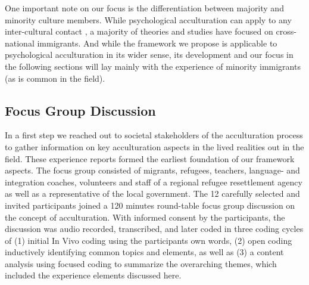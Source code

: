 \documentclass[man, 12pt, a4paper]{apa7}
\begin{document}
One important note on our focus is the differentiation between majority and minority culture members. While psychological acculturation can apply to any inter-cultural contact \citep[including, for example, the contact between indigenous people and colonial settlers, e.g.,][]{Berry1974}, a majority of theories and studies have focused on cross-national immigrants. And while the framework we propose is applicable to psychological acculturation in its wider sense, its development and our focus in the following sections will lay mainly with the experience of minority immigrants (as is common in the field).

\subsection{Focus Group Discussion}
In a first step we reached out to societal stakeholders of the acculturation process to gather information on key acculturation aspects in the lived realities out in the field. These experience reports formed the earliest foundation of our framework aspects. The focus group consisted of migrants, refugees, teachers, language- and integration coaches, volunteers and staff of a regional refugee resettlement agency as well as a representative of the local government. The 12 carefully selected and invited participants joined a 120 minutes round-table focus group discussion on the concept of acculturation. With informed consent by the participants, the discussion was audio recorded, transcribed, and later coded in three coding cycles of (1) initial In Vivo coding using the participants own words, (2) open coding inductively identifying common topics and elements, as well as (3) a content analysis using focused coding to summarize the overarching themes, which included the experience elements discussed here.
\end{document}
